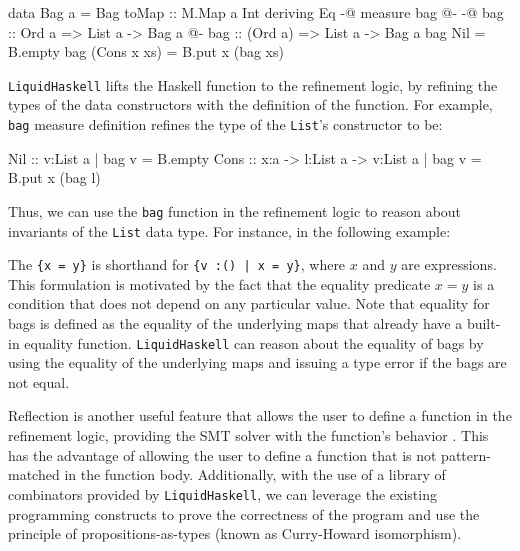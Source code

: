 \documentclass[]{rptuseminar}
\begin{document}
\begin{haskell}
data Bag a = Bag { toMap :: M.Map a Int } deriving Eq
{-@ measure bag @-}
{-@ bag :: Ord a => List a -> Bag a @-}
bag :: (Ord a) => List a -> Bag a
bag Nil = B.empty
bag (Cons x xs) = B.put x (bag xs)
\end{haskell}

\texttt{LiquidHaskell} lifts the Haskell function to the refinement logic, by refining the types of the data constructors with the
definition of the function\cite{niki_lecture_2024}. 
For example, \texttt{bag} measure definition refines the type of the \texttt{List}'s constructor to be:
\begin{haskell}
Nil  :: {v:List a | bag v = B.empty}
Cons :: x:a -> l:List a -> {v:List a | bag v = B.put x (bag l)}
\end{haskell}

Thus, we can use the \texttt{bag} function in the refinement logic to reason about 
invariants of the \texttt{List} data type. For instance, in the following example:

The \texttt{\{x = y\}} is shorthand for \texttt{\{v :() | x = y\}}, where $x$ and $y$ are expressions.
This formulation is motivated by the fact that the equality predicate $x = y$ is a condition that does not depend on any particular value.
Note that equality for bags is defined as the equality of the underlying maps that already have a built-in equality function.
\texttt{LiquidHaskell} can reason about the equality of bags by using the equality of the underlying maps and issuing a type error if the bags are not equal.


Reflection is another useful feature that allows the user to define a function in the refinement logic, providing
the SMT solver with the function's behavior \cite{vazou_refinement_2018}. 
This has the advantage of allowing the user to define a function that is not pattern-matched in the function body.
Additionally, with the use of a library of combinators provided by \texttt{LiquidHaskell}, we can leverage the existing programming constructs to 
prove the correctness of the program and use the principle of propositions-as-types (known as Curry-Howard isomorphism)\cite{vazou_refinement_2018}\cite{wadler_propositions_2015}.
\end{document}
